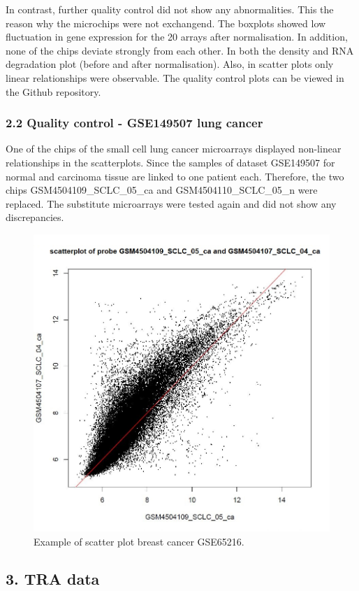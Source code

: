 \documentclass[
]{article}
\begin{document}
In contrast, further quality control did not show any abnormalities.
This the reason why the microchips were not exchangend. The boxplots
showed low fluctuation in gene expression for the 20 arrays after
normalisation. In addition, none of the chips deviate strongly from each
other. In both the density and RNA degradation plot (before and after
normalisation). Also, in scatter plots only linear relationships were
observable. The quality control plots can be viewed in the Github
repository.

\hypertarget{quality-control---gse149507-lung-cancer}{%
\subsubsection{2.2 Quality control - GSE149507 lung
cancer}\label{quality-control---gse149507-lung-cancer}}

One of the chips of the small cell lung cancer microarrays displayed
non-linear relationships in the scatterplots. Since the samples of
dataset GSE149507 for normal and carcinoma tissue are linked to one
patient each. Therefore, the two chips GSM4504109\_SCLC\_05\_ca and
GSM4504110\_SCLC\_05\_n were replaced. The substitute microarrays were
tested again and did not show any discrepancies.

\begin{figure}

{\centering \includegraphics[width=0.5\linewidth]{images/broken_chip_lung} 

}

\caption{Example of scatter plot breast cancer GSE65216.}\label{fig:Broken chip - lung qc}
\end{figure}

\hypertarget{tra-data}{%
\subsection{3. TRA data}\label{tra-data}}
\end{document}
